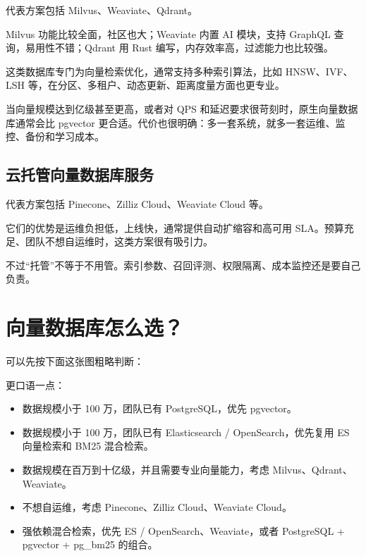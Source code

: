 \documentclass[10pt,a4paper]{ctexart}
\begin{document}
代表方案包括 Milvus、Weaviate、Qdrant。



Milvus 功能比较全面，社区也大；Weaviate 内置 AI 模块，支持 GraphQL 查询，易用性不错；Qdrant 用 Rust 编写，内存效率高，过滤能力也比较强。



这类数据库专门为向量检索优化，通常支持多种索引算法，比如 HNSW、IVF、LSH 等，在分区、多租户、动态更新、距离度量方面也更专业。



当向量规模达到亿级甚至更高，或者对 QPS 和延迟要求很苛刻时，原生向量数据库通常会比 pgvector 更合适。代价也很明确：多一套系统，就多一套运维、监控、备份和学习成本。



\subsection{云托管向量数据库服务}


代表方案包括 Pinecone、Zilliz Cloud、Weaviate Cloud 等。



它们的优势是运维负担低，上线快，通常提供自动扩缩容和高可用 SLA。预算充足、团队不想自运维时，这类方案很有吸引力。



不过“托管”不等于不用管。索引参数、召回评测、权限隔离、成本监控还是要自己负责。



\section{向量数据库怎么选？}


可以先按下面这张图粗略判断：



更口语一点：


\begin{itemize}[itemsep=2pt, topsep=4pt]
  \item 数据规模小于 100 万，团队已有 PostgreSQL，优先 pgvector。
  \item 数据规模小于 100 万，团队已有 Elasticsearch / OpenSearch，优先复用 ES 向量检索和 BM25 混合检索。
  \item 数据规模在百万到十亿级，并且需要专业向量能力，考虑 Milvus、Qdrant、Weaviate。
  \item 不想自运维，考虑 Pinecone、Zilliz Cloud、Weaviate Cloud。
  \item 强依赖混合检索，优先 ES / OpenSearch、Weaviate，或者 PostgreSQL + pgvector + pg\_bm25 的组合。
\end{itemize}
\end{document}
